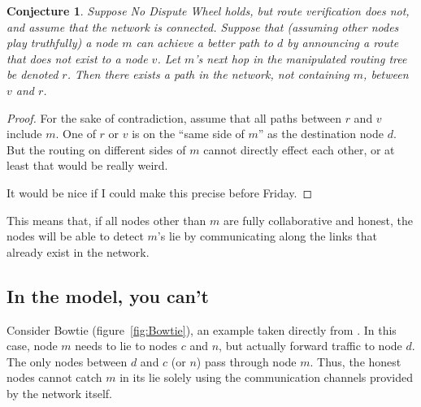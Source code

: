 \documentclass[12pt]{article}
\newtheorem{conjecture}{Conjecture}
\begin{document}
  \begin{conjecture}
    Suppose No Dispute Wheel holds, but route verification does not, and
    assume that the network is connected.
    Suppose that (assuming other nodes play truthfully)
    a node $m$ can achieve a better path to $d$ by announcing
    a route that does not exist to a node $v$.
    Let $m$'s next hop in the manipulated routing tree be denoted $r$.
    Then there exists a path in the network, not containing $m$,
    between $v$ and $r$.
  \end{conjecture}
  \begin{proof}
    For the sake of contradiction, assume that all paths between $r$
    and $v$ include $m$.
    One of $r$ or $v$ is on the ``same side of $m$'' as the destination
    node $d$. But the routing on different sides of $m$ cannot directly effect
    each other, or at least that would be really weird.

    It would be nice if I could make this precise before Friday.


  \end{proof}

  This means that, if all nodes other than $m$ are fully collaborative and
  honest, the nodes will be able to detect $m$'s lie
  by communicating along the links that already exist in the network.

  \subsection{In the \cite{Attraction} model, you can't}
    Consider Bowtie (figure~\ref{fig:Bowtie}),
    an example taken directly from \cite{Attraction}.
    In this case, node $m$ needs to lie to nodes $c$ and $n$,
    but actually forward traffic to node $d$.
    The only nodes between $d$ and $c$ (or $n$) pass through node $m$.
    Thus, the honest nodes cannot catch $m$ in its lie solely using 
    the communication channels provided by the network itself.
\end{document}
